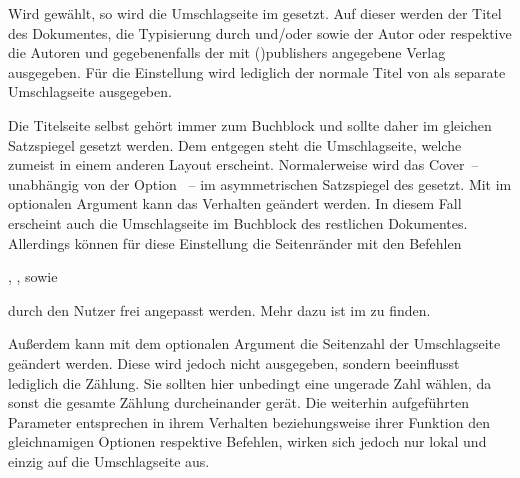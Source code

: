 \begin{DeclareEntity*}{}
\begin{DeclareEntity*}{}
\begin{DeclareEntity*}{}
\begin{Declaration}
\begin{Declaration}
\begin{Declaration}
\begin{Declaration}
\begin{Declaration}
\begin{Declaration}
\begin{Declaration}
\begin{Declaration}
\begin{Declaration}
\begin{Declaration}
\begin{Declaration}
Wird  gewählt, so wird die Umschlagseite im \TUDCD 
gesetzt. Auf dieser werden der Titel des Dokumentes, die Typisierung 
durch  und/oder  sowie der Autor oder respektive 
die Autoren und gegebenenfalls der mit \Macro(){publishers}
angegebene Verlag ausgegeben.
%
Für die Einstellung  wird lediglich der normale 
Titel von \KOMAScript als separate Umschlagseite ausgegeben. 

Die Titelseite selbst gehört immer zum Buchblock und sollte daher im gleichen 
Satzspiegel gesetzt werden. Dem entgegen steht die Umschlagseite, welche 
zumeist in einem anderen Layout erscheint. Normalerweise wird das Cover~-- 
unabhängig von der Option ~-- im asymmetrischen Satzspiegel 
des \CDs gesetzt. Mit  im optionalen 
Argument kann das Verhalten geändert werden. In diesem Fall erscheint auch die 
Umschlagseite im Buchblock des restlichen Dokumentes. Allerdings können für 
diese Einstellung die Seitenränder mit den Befehlen 
\begin{Entity}{}
, , 
 sowie   
\end{Entity}
durch den Nutzer frei angepasst werden. Mehr dazu ist im \scrguide zu finden.

Außerdem kann mit dem optionalen Argument die Seitenzahl der Umschlagseite 
geändert werden. Diese wird jedoch nicht ausgegeben, sondern beeinflusst 
lediglich die Zählung. Sie sollten hier unbedingt eine ungerade Zahl wählen, da 
sonst die gesamte Zählung durcheinander gerät. Die weiterhin aufgeführten 
Parameter entsprechen in ihrem Verhalten beziehungsweise ihrer Funktion den 
gleichnamigen Optionen respektive Befehlen, wirken sich jedoch nur lokal und 
einzig auf die Umschlagseite aus.%
\end{Declaration}
\end{Declaration}
\end{Declaration}
\end{Declaration}
\end{Declaration}
\end{Declaration}
\end{Declaration}
\end{Declaration}
\end{Declaration}
\end{Declaration}
\end{Declaration}


\end{DeclareEntity*}
\end{DeclareEntity*}
\end{DeclareEntity*}

